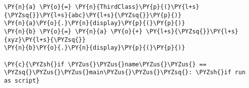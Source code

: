 \begin{Verbatim}[commandchars=\\\{\}]
\PY{n}{a} \PY{o}{=} \PY{n}{ThirdClass}\PY{p}{(}\PY{l+s}{\PYZsq{}}\PY{l+s}{abc}\PY{l+s}{\PYZsq{}}\PY{p}{)}
\PY{n}{a}\PY{o}{.}\PY{n}{display}\PY{p}{(}\PY{p}{)}
\PY{n}{b} \PY{o}{=} \PY{n}{a} \PY{o}{+} \PY{l+s}{\PYZsq{}}\PY{l+s}{xyz}\PY{l+s}{\PYZsq{}}
\PY{n}{b}\PY{o}{.}\PY{n}{display}\PY{p}{(}\PY{p}{)}

\PY{c}{\PYZsh{}if \PYZus{}\PYZus{}name\PYZus{}\PYZus{} == \PYZsq{}\PYZus{}\PYZus{}main\PYZus{}\PYZus{}\PYZsq{}: \PYZsh{}if run as script}
\end{Verbatim}
